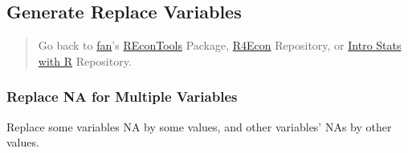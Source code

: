 \documentclass[
]{book}
\newenvironment{Shaded}{\begin{snugshade}}{\end{snugshade}}
\newcommand{\CommentTok}[1]{\textcolor[rgb]{0.56,0.35,0.01}{\textit{#1}}}
\newcommand{\DataTypeTok}[1]{\textcolor[rgb]{0.13,0.29,0.53}{#1}}
\newcommand{\DecValTok}[1]{\textcolor[rgb]{0.00,0.00,0.81}{#1}}
\newcommand{\KeywordTok}[1]{\textcolor[rgb]{0.13,0.29,0.53}{\textbf{#1}}}
\newcommand{\NormalTok}[1]{#1}
\newcommand{\OperatorTok}[1]{\textcolor[rgb]{0.81,0.36,0.00}{\textbf{#1}}}
\newcommand{\OtherTok}[1]{\textcolor[rgb]{0.56,0.35,0.01}{#1}}
\newcommand{\StringTok}[1]{\textcolor[rgb]{0.31,0.60,0.02}{#1}}
\begin{document}
\hypertarget{generate-replace-variables}{%
\subsection{Generate Replace Variables}\label{generate-replace-variables}}

\begin{quote}
Go back to \href{http://fanwangecon.github.io/CodeDynaAsset/}{fan}'s \href{https://fanwangecon.github.io/REconTools/}{REconTools} Package, \href{https://fanwangecon.github.io/R4Econ/}{R4Econ} Repository, or \href{https://fanwangecon.github.io/Stat4Econ/}{Intro Stats with R} Repository.
\end{quote}

\hypertarget{replace-na-for-multiple-variables}{%
\subsubsection{Replace NA for Multiple Variables}\label{replace-na-for-multiple-variables}}

Replace some variables NA by some values, and other variables' NAs by other values.

\begin{Shaded}
\end{Shaded}

\begin{table}[!h]
\centering
{}
\end{table}
\end{document}

